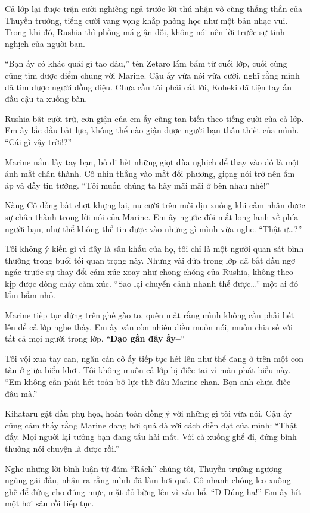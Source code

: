 \documentclass[../main.tex]{subfiles}
\begin{document}
Cả lớp lại được trận cười nghiêng ngả trước lời thú nhận vô cùng thẳng thắn của Thuyền trưởng, tiếng cười vang vọng khắp phòng học như một bản nhạc vui. Trong khi đó, Rushia thì phồng má giận dỗi, không nói nên lời trước sự tinh nghịch của người bạn.

``Bạn ấy có khác quái gì tao đâu,'' tên Zetaro lẩm bẩm từ cuối lớp, cuối cùng cũng tìm được điểm chung với Marine. Cậu ấy vừa nói vừa cười, nghĩ rằng mình đã tìm được người đồng điệu. Chưa cần tôi phải cất lời, Koheki đã tiện tay ấn đầu cậu ta xuống bàn.

Rushia bật cười trừ, cơn giận của em ấy cũng tan biến theo tiếng cười của cả lớp. Em ấy lắc đầu bất lực, không thể nào giận được người bạn thân thiết của mình. ``Cái gì vậy trời!?''

Marine nắm lấy tay bạn, bỏ đi hết những giọt đùa nghịch để thay vào đó là một ánh mắt chân thành. Cô nhìn thẳng vào mắt đối phương, giọng nói trở nên ấm áp và đầy tin tưởng. ``Tôi muốn chúng ta hãy mãi mãi ở bên nhau nhé!''

Nàng Cô đồng bất chợt khựng lại, nụ cười trên môi dịu xuống khi cảm nhận được sự chân thành trong lời nói của Marine. Em ấy ngước đôi mắt long lanh về phía người bạn, như thể không thể tin được vào những gì mình vừa nghe. ``Thật ư\dots?''

Tôi không ý kiến gì vì đây là sân khấu của họ, tôi chỉ là một người quan sát bình thường trong buổi tối quan trọng này. Nhưng vài đứa trong lớp đã bắt đầu ngơ ngác trước sự thay đổi cảm xúc xoay như chong chóng của Rushia, không theo kịp được dòng chảy cảm xúc. ``Sao lại chuyển cảnh nhanh thế được\dots'' một ai đó lẩm bẩm nhỏ.

Marine tiếp tục đứng trên ghế gào to, quên mất rằng mình không cần phải hét lên để cả lớp nghe thấy. Em ấy vẫn còn nhiều điều muốn nói, muốn chia sẻ với tất cả mọi người trong lớp. ``\textbf{Dạo gần đây ấy--}''

Tôi vội xua tay can, ngăn cản cô ấy tiếp tục hét lên như thể đang ở trên một con tàu ở giữa biển khơi. Tôi không muốn cả lớp bị điếc tai vì màn phát biểu này. ``Em không cần phải hét toàn bộ lực thế đâu Marine-chan. Bọn anh chưa điếc đâu mà.''

Kihataru gật đầu phụ họa, hoàn toàn đồng ý với những gì tôi vừa nói. Cậu ấy cũng cảm thấy rằng Marine đang hơi quá đà với cách diễn đạt của mình: ``Thật đấy. Mọi người lại tưởng bạn đang tấu hài mất. Với cả xuống ghế đi, đứng bình thường nói chuyện là được rồi.''

Nghe những lời bình luận từ đám ``Rách'' chúng tôi, Thuyền trưởng ngượng ngùng gãi đầu, nhận ra rằng mình đã làm hơi quá. Cô nhanh chóng leo xuống ghế để đứng cho đúng mực, mặt đỏ bừng lên vì xấu hổ. ``Đ-Đúng ha!'' Em ấy hít một hơi sâu rồi tiếp tục.
\end{document}
